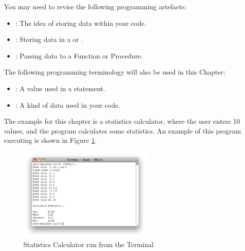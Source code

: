 \bigskip

You may need to revise the following programming artefacts:
\begin{itemize}
  \item {}: The idea of storing data within your code.
  \item {}: Storing data in a  or .
  \item {}: Passing data to a Function or Procedure.
\end{itemize}

The following programming terminology will also be used in this Chapter:
\begin{itemize}
  \item {}: A value used in a statement.
  \item {}: A kind of data used in your code.
\end{itemize}

The example for this chapter is a statistics calculator, where the user enters 10 values, and the program calculates some statistics. An example of this program executing is shown in Figure \ref{fig:simple-stats}.

\begin{figure}[h]
   \centering
   \includegraphics[width=0.6\textwidth]{./topics/arrays/images/SimpleStats} 
   \caption[Statistics Calculator Terminal]{Statistics Calculator run from the Terminal}
   \label{fig:simple-stats}
\end{figure}










\clearpage

